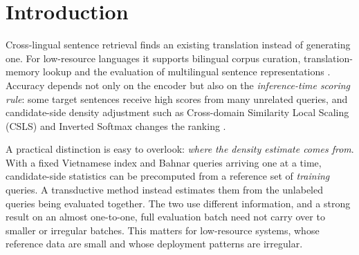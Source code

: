 \section{Introduction}
Cross-lingual sentence retrieval finds an existing translation instead of generating one. For low-resource languages it supports bilingual corpus curation, translation-memory lookup and the evaluation of multilingual sentence representations \cite{artetxe2019margin}. Accuracy depends not only on the encoder but also on the \emph{inference-time scoring rule}: some target sentences receive high scores from many unrelated queries, and candidate-side density adjustment such as Cross-domain Similarity Local Scaling (CSLS) and Inverted Softmax changes the ranking \cite{dinu2015improving,smith2017offline,conneau2018word}.

A practical distinction is easy to overlook: \emph{where the density estimate comes from}. With a fixed Vietnamese index and Bahnar queries arriving one at a time, candidate-side statistics can be precomputed from a reference set of \emph{training} queries. A transductive method instead estimates them from the unlabeled queries being evaluated together. The two use different information, and a strong result on an almost one-to-one, full evaluation batch need not carry over to smaller or irregular batches. This matters for low-resource systems, whose reference data are small and whose deployment patterns are irregular.

